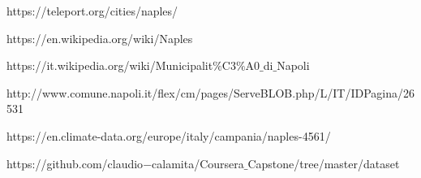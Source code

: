 \documentclass[a4paper, 12pt, oneside]{book}
\begin{document}
\begin{thebibliography}{9}
https://teleport.org/cities/naples/
 
https://en.wikipedia.org/wiki/Naples

https://it.wikipedia.org/wiki/Municipalit$\%$C3$\%$A0$\_$di$\_$Napoli

http://www.comune.napoli.it/flex/cm/pages/ServeBLOB.php/L/IT/IDPagina/26531 

https://en.climate-data.org/europe/italy/campania/naples-4561/

https://github.com/claudio$-$calamita/Coursera$\_$Capstone/tree/master/dataset

\end{thebibliography}
\end{document}
